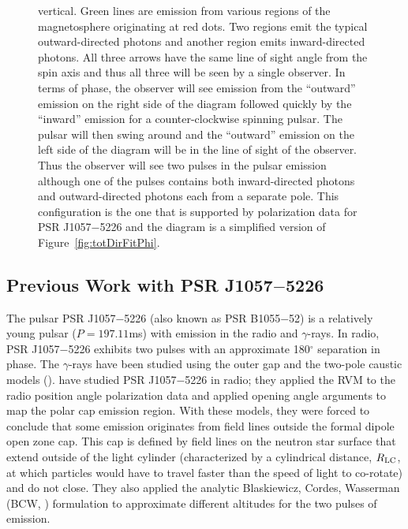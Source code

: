 \begin{figure}[t!!]
\begin{center}
{vertical. Green lines are emission from various regions of the magnetosphere
originating at red dots. Two regions emit the typical outward-directed photons
and another region emits inward-directed photons. All three arrows have the
same line of sight angle from the spin axis and thus all three will be seen by
a single observer. In terms of phase, the observer will see emission from
the ``outward'' emission on the right side of the diagram followed
quickly by the ``inward'' emission for a counter-clockwise spinning
pulsar. The pulsar will then swing around and the ``outward'' emission
on the left side of the diagram will be in the line of sight of the observer.
Thus the observer will see two pulses in the pulsar emission although one of
the pulses contains both inward-directed photons and outward-directed photons
each from a separate pole. This configuration is the one that is supported
by polarization data for PSR J1057$-$5226 and the diagram is a simplified version of Figure~\ref{fig:totDirFitPhi}.
}
\end{center}
\end{figure}



\subsection{Previous Work with PSR J1057$-$5226}
\label{sec:intro}



The pulsar PSR J1057$-$5226 (also known as PSR B1055$-$52) is a relatively young pulsar
($P=197.11$ms) with emission in the radio and $\gamma$-rays.  In radio, PSR J1057$-$5226 exhibits two
pulses with an approximate 180$^\circ$ separation in phase.  The $\gamma$-rays have been studied
using the outer gap and the two-pole caustic models (\citealp{romani2010constraining}).  
\cite{weltevrede2009mapping} have studied PSR J1057$-$5226 in radio; they applied
the RVM to the radio position angle polarization data and
applied opening angle arguments to map the polar cap emission region.  With these
models, they were forced to conclude that some emission originates from field lines outside 
the formal dipole open zone cap.  This cap is defined by field lines on the
neutron star surface that extend outside of the
light cylinder (characterized by a cylindrical distance, $R_{\rm{LC}}$, at which particles
would have to travel faster than the speed of light to co-rotate) and do not close.
They also
applied the analytic Blaskiewicz, Cordes, Wasserman (BCW, \citealp{blaskiewicz1991relativistic})
formulation to approximate different altitudes for the two pulses of 
emission.



